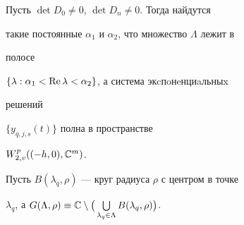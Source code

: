  


\begin{lem} 


Пусть $\det D_0\ne0$, $\det D_n\ne0$. Тогда найдутся 


такие постоянные $\alpha_1$ и $\alpha_2$, что множество $\Lambda$ лежит в 


полосе 


$\{\lambda:\alpha_1<\operatorname{Re}\lambda<\alpha_2\}$, а система экcпoнeнциaльныx 


решений 


$\{y_{q,j,s}(t)\}$ полна в пространстве 


$W^p_{2,v}((-h,0),\Bbb C^m)$. 


\end{lem} 


 


Пусть $B(\lambda_q,\rho)$ --- круг радиуса $\rho$ с центром в точке 


$\lambda_q$, а $G(\Lambda,\rho)\equiv\Bbb C\setminus 


\big(\bigcup\limits_{\lambda_q\in\Lambda}B(\lambda_q,\rho)\big)$. 


 


